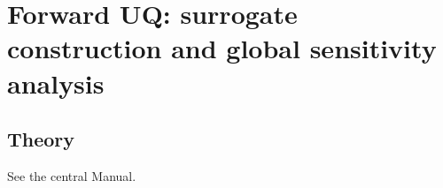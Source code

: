 \documentclass[12pt]{article}
\begin{document}
\section{Forward UQ: surrogate construction and global sensitivity analysis}
\subsection*{Theory}
See the central Manual.


\end{document}
